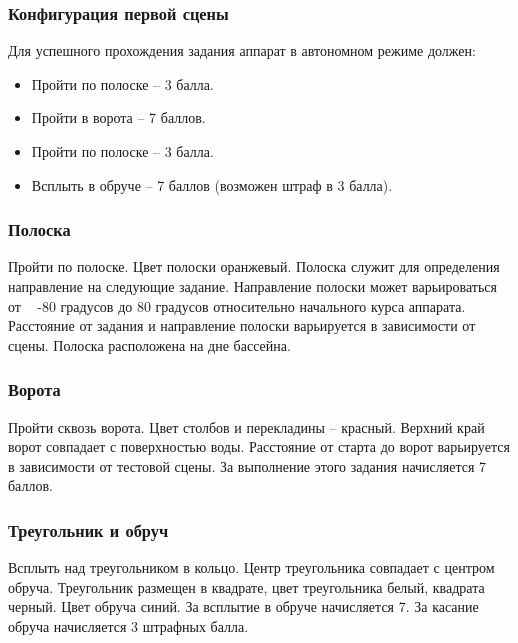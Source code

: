 
\subsubsection*{Конфигурация первой сцены}


Для успешного прохождения задания аппарат в автономном режиме
должен:

\begin{itemize}
    \item Пройти по полоске – 3 балла. 
    \item Пройти в ворота – 7 баллов.
    \item Пройти по полоске – 3 балла. 
    \item Всплыть в обруче – 7 баллов (возможен штраф в 3 балла).
\end{itemize}

\subsubsection*{Полоска}


Пройти по полоске. Цвет полоски оранжевый. Полоска
служит для определения направление на следующие задание. Направление полоски
может варьироваться от   -80 градусов до
80 градусов относительно начального курса аппарата. Расстояние от задания и
направление полоски варьируется в зависимости от сцены. Полоска расположена на
дне бассейна.

\subsubsection*{Ворота}


Пройти сквозь ворота. Цвет столбов и перекладины –
красный. Верхний край ворот совпадает с поверхностью воды. Расстояние от старта
до ворот варьируется в зависимости от тестовой сцены. За выполнение этого
задания начисляется 7 баллов. 

\subsubsection*{Треугольник и обруч}


Всплыть над треугольником в кольцо. Центр треугольника
совпадает с центром обруча. Треугольник размещен в квадрате, цвет треугольника
белый, квадрата черный. Цвет обруча синий. За всплытие в обруче начисляется 7.
За касание обруча начисляется 3 штрафных балла.

